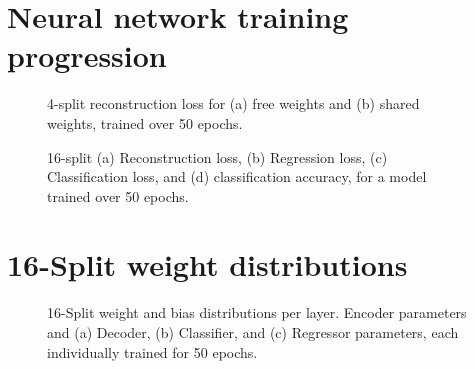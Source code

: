 \documentclass[a4paper, 12pt, twoside]{article}
\begin{document}
\begin{appendices}
	\section{Neural network training progression}\label{app:nn_loss}
	\begin{figure}[H]
		\centering
		\caption{4-split reconstruction loss for (a) free weights and (b) shared weights, trained over 50 epochs.}
	\end{figure}
	\begin{figure}[H]
		\centering
		\hspace{1mm}
		\caption{16-split (a) Reconstruction loss, (b) Regression loss, (c) Classification loss, and (d) classification accuracy, for a model trained over 50 epochs.}
	\end{figure}

	\section{16-Split weight distributions}\label{app:nn_weight}
	\begin{figure}[H]
		\begin{center}
			\hspace{1mm}
			\hspace{1mm}
			\caption{16-Split weight and bias distributions per layer. Encoder parameters and (a) Decoder, (b) Classifier, and (c) Regressor parameters, each individually trained for 50 epochs.}
			\label{fig:weights}
		\end{center}
	\end{figure}

\end{appendices}
\newpage
\end{document}
